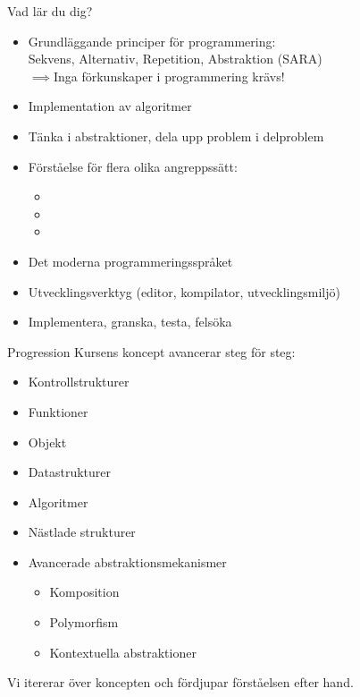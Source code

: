 \begin{Slide}{Vad lär du dig?}
\begin{itemize}
\item Grundläggande principer för programmering:\\ Sekvens, Alternativ, Repetition, Abstraktion (SARA)\\$\implies$Inga förkunskaper i programmering krävs!
\item Implementation av algoritmer
\item Tänka i abstraktioner, dela upp problem i delproblem
\item Förståelse för flera olika angreppssätt:
\begin{itemize}
\item {}%
\item {}%
\item {}%
\end{itemize}
\item Det moderna programmeringsspråket  %
\item Utvecklingsverktyg (editor, kompilator, utvecklingsmiljö)
\item Implementera, granska, testa, felsöka
\end{itemize}
\end{Slide}

\begin{Slide}{Progression}
Kursens koncept avancerar steg för steg:
\begin{itemize}
\item Kontrollstrukturer
\item Funktioner
\item Objekt
\item Datastrukturer 
\item Algoritmer
\item Nästlade strukturer
\item Avancerade abstraktionsmekanismer
\begin{itemize}
\item Komposition
\item Polymorfism
\item Kontextuella abstraktioner
\end{itemize}
\end{itemize}
Vi itererar över koncepten och fördjupar förståelsen efter hand.
\end{Slide}


